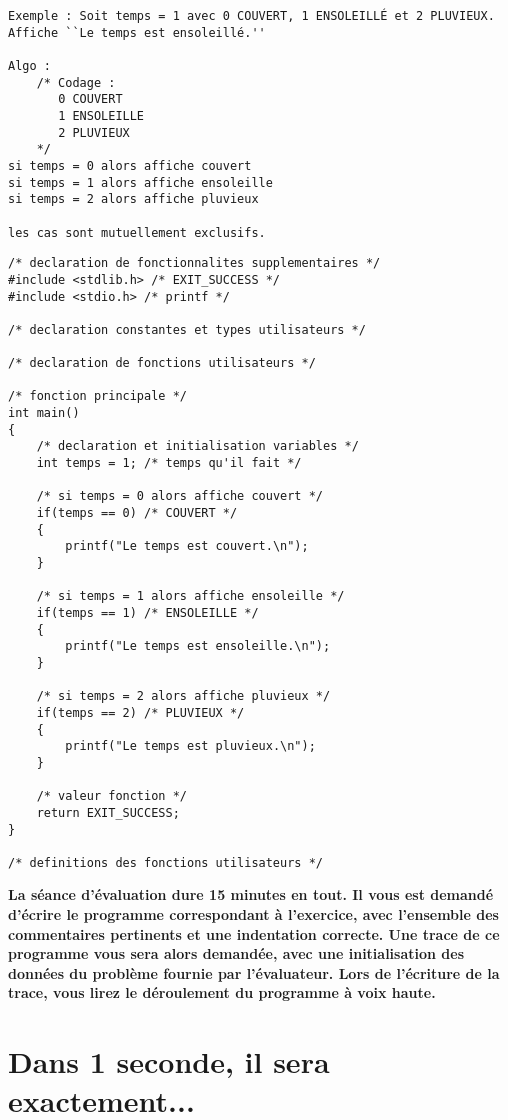 \begin{correction}
\begin{verbatim}
Exemple : Soit temps = 1 avec 0 COUVERT, 1 ENSOLEILLÉ et 2 PLUVIEUX.
Affiche ``Le temps est ensoleillé.''

Algo :
    /* Codage :
       0 COUVERT
       1 ENSOLEILLE
       2 PLUVIEUX
    */
si temps = 0 alors affiche couvert
si temps = 1 alors affiche ensoleille
si temps = 2 alors affiche pluvieux 

les cas sont mutuellement exclusifs.
\end{verbatim}
\begin{verbatim}
/* declaration de fonctionnalites supplementaires */
#include <stdlib.h> /* EXIT_SUCCESS */
#include <stdio.h> /* printf */

/* declaration constantes et types utilisateurs */

/* declaration de fonctions utilisateurs */

/* fonction principale */
int main()
{
    /* declaration et initialisation variables */
    int temps = 1; /* temps qu'il fait */

    /* si temps = 0 alors affiche couvert */ 
    if(temps == 0) /* COUVERT */
    {
        printf("Le temps est couvert.\n");
    }

    /* si temps = 1 alors affiche ensoleille */ 
    if(temps == 1) /* ENSOLEILLE */
    {
        printf("Le temps est ensoleille.\n");
    }

    /* si temps = 2 alors affiche pluvieux */ 
    if(temps == 2) /* PLUVIEUX */
    {
        printf("Le temps est pluvieux.\n");
    }
    
    /* valeur fonction */
    return EXIT_SUCCESS;
}

/* definitions des fonctions utilisateurs */
\end{verbatim}
\end{correction}

\newpage
\textbf{La séance d'évaluation dure 15 minutes en tout. Il vous est demandé d'écrire le programme correspondant à l'exercice, avec l'ensemble des commentaires pertinents et une indentation correcte. Une trace de ce programme vous sera alors demandée, avec une initialisation des données du problème fournie par l'évaluateur. Lors de l'écriture de la trace, vous lirez le déroulement du programme à voix haute.}

\section{Dans 1 seconde, il sera exactement...}

